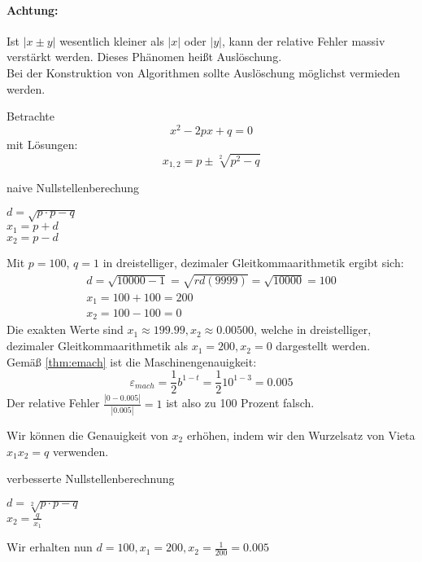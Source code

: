 \paragraph{Achtung:} Ist $|x \pm y|$ wesentlich kleiner als $|x|$ oder $|y|$, kann der relative Fehler massiv verstärkt werden. 
Dieses Phänomen heißt Auslöschung.\\
Bei der Konstruktion von Algorithmen sollte Auslöschung möglichst vermieden werden.
\begin{example}\label{eg:pq}
Betrachte \\
\begin{equation}
\label{eqn:pq}
x^2-2px+q=0
\end{equation}
mit Lösungen:
\[
x_{1,2} = p \pm \sqrt[2]{p^2-q} 
\]


\begin{algorithm}[H]
 \label{alg:nst1}
 \caption{naive Nullstellenberechung}
 $d=\sqrt{p\cdot p -q}$ \\
 $x_1= p+d$ \\
 $x_2= p-d$
 \end{algorithm}
 Mit $p=100$, $q=1$ in dreistelliger, dezimaler Gleitkommaarithmetik ergibt sich:
 \begin{equation*}
	 \begin{split}
		 d= \sqrt{10000-1}= \sqrt{rd(9999)}=\sqrt{10000} = 100 \\
		 x_1=100+100=200 \\
		 x_2= 100-100 =0
	 \end{split}
 \end{equation*}
Die exakten Werte sind  $x_1 \approx 199.99, x_2 \approx 0.00500$, welche in dreistelliger, dezimaler Gleitkommaarithmetik als $x_1=200,x_2=0$ dargestellt werden. \\
Gemäß \ref{thm:emach} ist die Maschinengenauigkeit:
\[
\varepsilon_{mach} = \frac{1}{2}b^{1-t}= \frac{1}{2}10^{1-3}=0.005
\]
Der relative Fehler $\frac{|0-0.005|}{|0.005|}=1$ ist also zu 100 Prozent falsch.
\end{example}
Wir können die Genauigkeit von $x_2$ erhöhen, indem wir den Wurzelsatz von Vieta $x_1x_2=q$ verwenden.\\
\begin{algorithm}[H]
 \caption{verbesserte Nullstellenberechnung}
 $d= \sqrt[2]{p \cdot p -q}$ \\
 $x_2=\frac{q}{x_1}$
 \end{algorithm}
 Wir erhalten nun $d=100, x_1=200,x_2=\frac{1}{200}=0.005$

